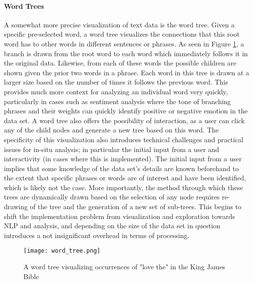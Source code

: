 \paragraph{Word Trees}
A somewhat more precise visualization of text data is the word tree\cite{Wattenberg2008}. Given a specific pre-selected word, a word tree visualizes the connections that this root word has to other words in different sentences or phrases. As seen in Figure \ref{fig:wordtree}, a branch is drawn from the root word to each word which immediately follows it in the original data. Likewise, from each of these words the possible children are shown given the prior two words in a phrase. Each word in this tree is drawn at a larger size based on the number of times it follows the previous word. This provides much more context for analyzing an individual word very quickly, particularly in cases such as sentiment analysis where the tone of branching phrases and their weights can quickly identify positive or negative emotion in the data set. A word tree also offers the possibility of interaction, as a user can click any of the child nodes and generate a new tree based on this word. The specificity of this visualization also introduces technical challenges and practical issues for in-situ analysis; in particular the initial input from a user and interactivity (in cases where this is implemented). The initial input from a user implies that some knowledge of the data set's details are known beforehand to the extent that specific phrases or words are of interest and have been identified, which is likely not the case. More importantly, the method through which these trees are dynamically drawn based on the selection of any node requires re-drawing of the tree and the generation of a new set of sub-trees. This begins to shift the implementation problem from visualization and exploration towards NLP and analysis, and depending on the size of the data set in question introduces a not insignificant overhead in terms of processing. 

\begin{figure}
	\centering
	\texttt{[image: word\_tree.png]}
	\caption{A word tree visualizing occurrences of "love the" in the King James Bible \cite{Wattenberg2008}}
	\label{fig:wordtree}
\end{figure}




